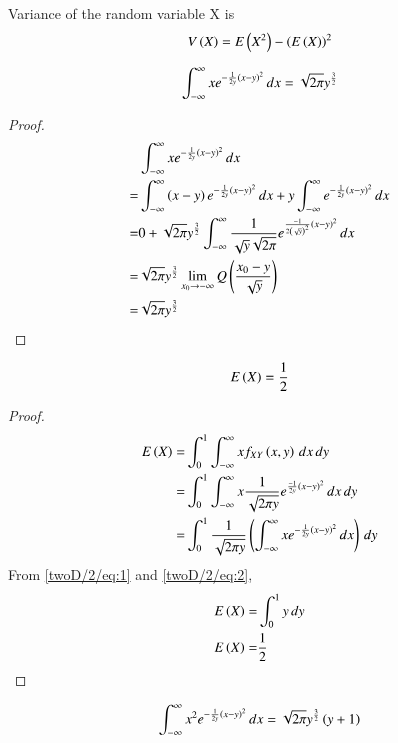 Variance of the random variable X is
\begin{align}
 V\left(X\right) = E\left(X^2\right)-\left(E\left(X\right)\right)^2   
\end{align}
\begin{lemma}
\begin{align}
    \int_{-\infty}^{\infty}xe^{-\frac{1}{2y}\left(x-y\right)^2}\,dx = \sqrt{2\pi}y^\frac{3}{2}
\end{align}
\end{lemma}
\begin{proof}
\begin{align}
    &\int_{-\infty}^{\infty}xe^{-\frac{1}{2y}\brak{x-y}^2}\,dx\\
  =&\int_{-\infty}^{\infty}\brak{x-y}e^{-\frac{1}{2y}\brak{x-y}^2}\,dx+y\int_{-\infty}^{\infty}e^{-\frac{1}{2y}\brak{x-y}^2}\,dx\\
 =&0+\sqrt{2\pi}y^{\frac{3}{2}}\int_{-\infty}^{\infty}\frac{1}{\sqrt{y}\sqrt{2\pi}}e^{\frac{-1}{2\brak{\sqrt{y}}^2}\brak{x-y}^2}\,dx\\
 =&\sqrt{2\pi}y^\frac{3}{2}\lim_{x_0 \to -\infty}Q\brak{\frac{x_0 - y}{\sqrt{y}}}\\
  =&\sqrt{2\pi}y^\frac{3}{2} \label{twoD/2/eq:2}
\end{align}
\end{proof}
\begin{lemma}
\begin{align}
E\left(X\right) = \frac{1}{2}
\end{align}
\end{lemma}
\begin{proof}
\begin{align}
 E\brak{X}=&\int_{0}^{1}\int_{-\infty}^{\infty}x f_{XY}\brak{x,y}\,dx\,dy\\
    =&\int_{0}^{1}\int_{-\infty}^{\infty}x\frac{1}{\sqrt{2\pi y}}e^{\frac{-1}{2y}\brak{x-y}^2}\,dx \,dy\\
     =&\int_{0}^{1}\frac{1}{\sqrt{2\pi y}}\brak{\int_{-\infty}^{\infty}xe^{-\frac{1}{2y}\brak{x-y}^2}\,dx}\,dy \label{twoD/2/eq:1}
\end{align}
From \eqref{twoD/2/eq:1} and \eqref{twoD/2/eq:2}, 
\begin{align}
E\brak{X}=&\int_{0}^{1}y\,dy\\
E\brak{X}=&\frac{1}{2} \label{twoD/2/eq:3}
\end{align}
\end{proof}
\begin{lemma}
\begin{align}
\int_{-\infty}^{\infty}x^2e^{-\frac{1}{2y}\left(x-y\right)^2}\,dx=\sqrt{2\pi}y^\frac{3}{2}\left(y+1\right)
\end{align}
\end{lemma} 
